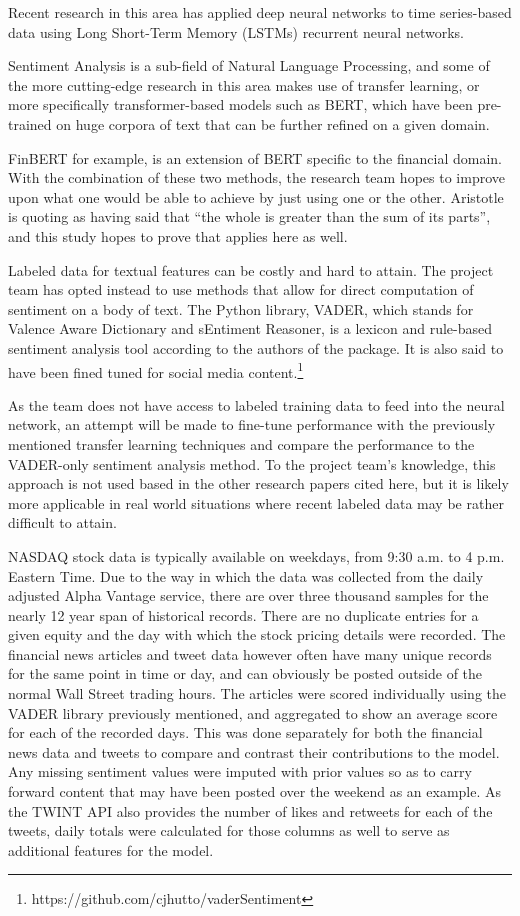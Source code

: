 \documentclass{llncs}
\begin{document}
Recent research in this area has applied deep neural networks to time series-based data using Long Short-Term Memory (LSTMs) recurrent neural networks.

Sentiment Analysis is a sub-field of Natural Language Processing, and some of the more cutting-edge research in this area makes use of transfer learning, or more specifically transformer-based models such as BERT, which have been pre-trained on huge corpora of text that can be further refined on a given domain.

FinBERT for example, is an extension of BERT specific to the financial domain.
With the combination of these two methods, the research team hopes to improve upon what one would be able to achieve by just using one or the other. Aristotle is quoting as having said that “the whole is greater than the sum of its parts”, and this study hopes to prove that applies here as well.

Labeled data for textual features can be costly and hard to attain.  The project team has opted instead to use methods that allow for direct computation of sentiment on a body of text.  The Python library, VADER, which stands for Valence Aware Dictionary and sEntiment Reasoner, is a lexicon and rule-based sentiment analysis tool according to the authors of the package.  It is also said to have been fined tuned for social media content.\footnote{https://github.com/cjhutto/vaderSentiment}

As the team does not have access to labeled training data to feed into the neural network, an attempt will be made to fine-tune performance with the previously mentioned transfer learning techniques and compare the performance to the VADER-only sentiment analysis method.  To the project team's knowledge, this approach is not used based in the other research papers cited here, but it is likely more applicable in real world situations where recent labeled data may be rather difficult to attain.

NASDAQ stock data is typically available on weekdays, from 9:30 a.m. to 4 p.m. Eastern Time.  Due to the way in which the data was collected from the daily adjusted Alpha Vantage service, there are over three thousand samples for the nearly 12 year span of historical records.  There are no duplicate entries for a given equity and the day with which the stock pricing details were recorded.  The financial news articles and tweet data however often have many unique records for the same point in time or day, and can obviously be posted outside of the normal Wall Street trading hours.  The articles were scored individually using the VADER library previously mentioned, and aggregated to show an average score for each of the recorded days.  This was done separately for both the financial news data and tweets to compare and contrast their contributions to the model.  Any missing sentiment values were imputed with prior values so as to carry forward content that may have been posted over the weekend as an example.  As the TWINT API also provides the number of likes and retweets for each of the tweets, daily totals were calculated for those columns as well to serve as additional features for the model.
\end{document}
